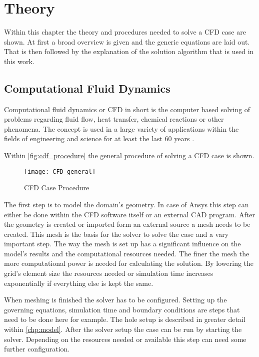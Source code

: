 \documentclass[../thesis.tex]{subfiles}
\begin{document}
\chapter{Theory}
\label{chp:theory}

Within this chapter the theory and procedures needed to solve a CFD case are shown. At first a broad overview is given and the generic equations are laid out. That is then followed by the explanation of the solution algorithm that is used in this work.
 
\section{Computational Fluid Dynamics}

Computational fluid dynamics or CFD in short is the computer based solving of problems regarding fluid flow, heat transfer, chemical reactions or other phenomena. The concept is used in a large variety of applications within the fields of engineering and science for at least the last 60 years \cite{versteeg2007introduction}.

Within \autoref{fig:cdf_procedure} the general procedure of solving a CFD case is shown.
\begin{figure}[htbp]
	\centering
	\texttt{[image: CFD\_general]}
	\caption{CFD Case Procedure}
	\label{fig:cdf_procedure}
\end{figure}

The first step is to model the domain's geometry. In case of Ansys this step can either be done within the CFD software itself or an external CAD program. After the geometry is created or imported form an external source a mesh needs to be created. This mesh is the basis for the solver to solve the case and a vary important step. The way the mesh is set up has a significant influence on the model's results and the computational resources needed. The finer the mesh the more computational power is needed for calculating the solution. By lowering the grid's element size the resources needed or simulation time increases exponentially if everything else is kept the same.

When meshing is finished the solver has to be configured. Setting up the governing equations, simulation time and boundary conditions are steps that need to be done here for example. The hole setup is described in greater detail within \autoref{chp:model}. After the solver setup the case can be run by starting the solver. Depending on the resources needed or available this step can need some further configuration.
\end{document}
